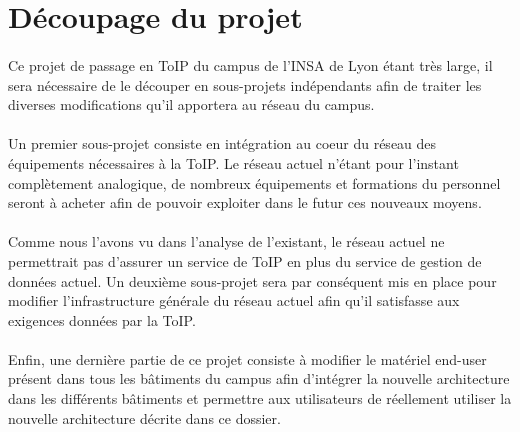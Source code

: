 \section{Découpage du projet}

\paragraph{} Ce projet de passage en ToIP du campus de l'INSA de Lyon étant très large, il sera nécessaire de le découper en sous-projets indépendants afin de traiter les diverses modifications qu'il apportera au réseau du campus.

\paragraph{} Un premier sous-projet consiste en intégration au coeur du réseau des équipements nécessaires à la ToIP. Le réseau actuel n'étant pour l'instant complètement analogique, de nombreux équipements et formations du personnel seront à acheter afin de pouvoir exploiter dans le futur ces nouveaux moyens.

\paragraph{} Comme nous l'avons vu dans l'analyse de l'existant, le réseau actuel ne permettrait pas d'assurer un service de ToIP en plus du service de gestion de données actuel. Un deuxième sous-projet sera par conséquent mis en place pour modifier l'infrastructure générale du réseau actuel afin qu'il satisfasse aux exigences données par la ToIP.

\paragraph{} Enfin, une dernière partie de ce projet consiste à modifier le matériel end-user présent dans tous les bâtiments du campus afin d'intégrer la nouvelle architecture dans les différents bâtiments et permettre aux utilisateurs de réellement utiliser la nouvelle architecture décrite dans ce dossier.